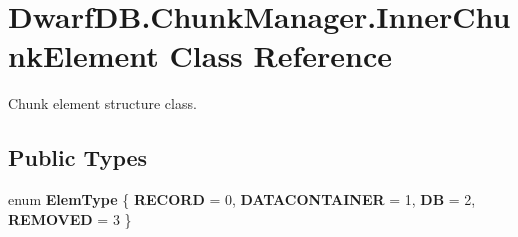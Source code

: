 \hypertarget{class_dwarf_d_b_1_1_chunk_manager_1_1_inner_chunk_element}{
\section{DwarfDB.ChunkManager.InnerChunkElement Class Reference}
\label{class_dwarf_d_b_1_1_chunk_manager_1_1_inner_chunk_element}
}


Chunk element structure class.  


\subsection*{Public Types}
\begin{DoxyCompactItemize}
\item 
enum {\bfseries ElemType} \{ {\bfseries RECORD} =  0, 
{\bfseries DATACONTAINER} =  1, 
{\bfseries DB} =  2, 
{\bfseries REMOVED} =  3
 \}
\end{DoxyCompactItemize}
